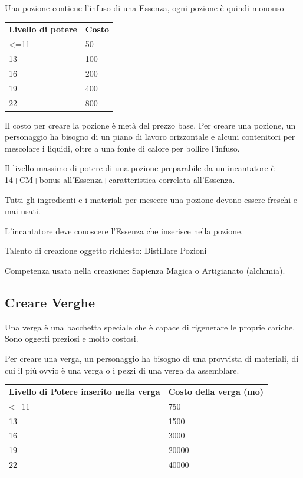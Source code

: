 \documentclass[a4paper,11pt,twoside,openany]{book}
\begin{document}
Una pozione contiene l'infuso di una Essenza, ogni pozione è quindi monouso

\bigskip

\begin{tabular}{ll}
	\toprule
	\textbf{Livello di potere} & \textbf{Costo}\\
	\textless=11               & 50\\
	13         & 100\\
	16         & 200\\
	19         & 400\\
	22         & 800\\
\end{tabular}

\bigskip

Il costo per creare la pozione è metà del prezzo base. Per creare una pozione, un personaggio ha bisogno di un piano di lavoro orizzontale e alcuni contenitori per mescolare i liquidi, oltre a una fonte di calore per bollire l'infuso.

Il livello massimo di potere di una pozione preparabile da un incantatore è 14+CM+bonus all'Essenza+caratteristica correlata all'Essenza.

Tutti gli ingredienti e i materiali per mescere una pozione devono essere freschi e mai usati.

L'incantatore deve conoscere l'Essenza che inserisce nella pozione.

Talento di creazione oggetto richiesto: Distillare Pozioni

Competenza usata nella creazione: Sapienza Magica o Artigianato (alchimia).

\subsection{Creare Verghe}

Una verga è una bacchetta speciale che è capace di rigenerare le proprie cariche. Sono oggetti preziosi e molto costosi.

Per creare una verga, un personaggio ha bisogno di una provvista di materiali, di cui il più ovvio è una verga o i pezzi di una verga da assemblare.

\medskip

\begin{tabular}{ll}
	\toprule
	\textbf{Livello di Potere inserito nella verga} & \textbf{Costo della verga (mo)}\\
	\textless=11    & 750\\
	13              & 1500\\
	16              & 3000\\
	19              & 20000\\
	22              & 40000\\
\end{tabular}
\end{document}
